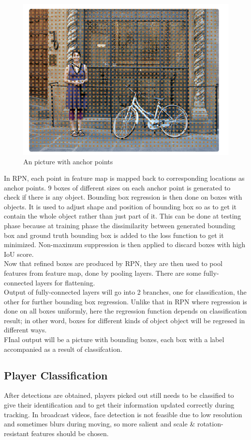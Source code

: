 \documentclass{article}
\begin{document}
\begin{figure}
  \centering
  \includegraphics[scale=0.25]{report/pic/2/anchor_point.png} 
  \caption{An picture with anchor points}
\end{figure}
In RPN, each point in feature map is mapped back to corresponding locations as anchor points. 9 boxes of different sizes on each anchor point is generated to check if there is any object. Bounding box regression is then done on boxes with objects. It is used to adjust shape and position of bounding box so as to get it contain the whole object rather than just part of it. This can be done at testing phase because at training phase the dissimilarity between generated bounding box and ground truth bounding box is added to the loss function to get it minimized. Non-maximum suppression is then applied to discard boxes with high IoU score.\\
Now that refined boxes are produced by RPN, they are then used to pool features from feature map, done by pooling layers. There are some fully-connected layers for flattening.\\
Output of fully-connected layers will go into 2 branches, one for classification, the other for further bounding box regression. Unlike that in RPN where regression is done on all boxes uniformly, here the regression function depends on classification result; in other word, boxes for different kinds of object object will be regresed in different ways.\\
FInal output will be a picture with bounding boxes, each box with a label accompanied as a result of classifcation.\\
\subsection{Player Classification}
After detections are obtained, players picked out still needs to be classified to give their identification and to get their information updated correctly during tracking. In broadcast videos, face detection is not feasible due to low resolution and sometimes blurs during moving, so more salient and scale \& rotation-resistant features should be chosen.
\end{document}
